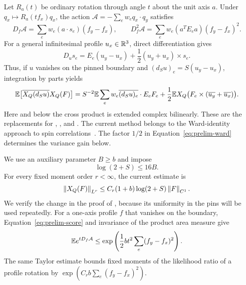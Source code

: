 Let $R_a(t)$ be ordinary rotation through angle $t$ about the unit axis
$a$. Under $q_x\mapsto R_a(tf_x)q_x$, the action
$\mathcal A=-\sum_e w_eq_x\cdot q_y$ satisfies
\begin{equation}
 D_f\mathcal A=\sum_e w_e(a\cdot s_e)(f_y-f_x),\qquad
 D_f^2\mathcal A=\sum_e w_e(a^TE_ea)(f_y-f_x)^2.
 \label{eq:prelim-score}
\end{equation}
For a general infinitesimal profile $u_x\in\mathbb R^3$, direct differentiation
gives
\begin{equation}
 D_us_e=E_e(u_y-u_x)+\frac12(u_y+u_x)\times s_e.
 \label{eq:prelim-bond-derivative}
\end{equation}
Thus, if $u$ vanishes on the pinned boundary and
$(d_Su)_e=S(u_y-u_x)$, integration by parts yields
\begin{equation}
 \mathbb E\bigl[\overline{X_Q(d_Su)}X_Q(F)\bigr]
 =S^{-2}\mathbb E\sum_e w_e\overline{(d_Su)_e}\cdot E_eF_e
 +\frac12\mathbb E X_Q\bigl(F_e\times(\overline{u_y}+\overline{u_x})\bigr).
 \label{eq:prelim-ward}
\end{equation}
Here and below the cross product is extended complex bilinearly. These
are the replacements for , , and
. The current method belongs to the Ward-identity approach to spin
correlations~\cite{AizenmanSimonWard}. The factor $1/2$ in
Equation~\eqref{eq:prelim-ward} determines the variance gain below.

We use an auxiliary parameter $B\ge b$ and impose
\begin{equation}
 \log(2+S)\le16B.
 \label{eq:prelim-size-restriction}
\end{equation}
For every fixed moment order $r<\infty$, the current estimate is
\begin{equation}
 \left\lVert X_Q(F)\right\rVert_{L^r}\le
 C_r(1+b)\log(2+S)\left\lVert F\right\rVert_{C^1}.
 \label{eq:prelim-current-moment}
\end{equation}
We verify the change in the proof of , because its
uniformity in the pins will be used repeatedly. For a one-axis profile
$f$ that vanishes on the boundary, Equation~\eqref{eq:prelim-score}
and invariance of the product area measure give
\begin{equation}
 \mathbb E e^{tD_f\mathcal A}
 \le\exp\left(\frac12bt^2\sum_e(f_y-f_x)^2\right).
 \label{eq:prelim-score-mgf}
\end{equation}
The same Taylor estimate bounds fixed moments of the likelihood ratio
of a profile rotation by $\exp(C_rb\sum_e(f_y-f_x)^2)$.

